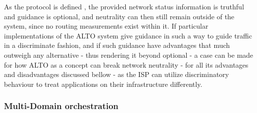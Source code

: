     As the protocol is defined \cite{alto-protocol}, the provided network status information is truthful and guidance is optional, and neutrality can then still remain outside of the system, since no routing measurements exist within it.
    If particular implementations of the ALTO system give guidance in such a way to guide traffic in a discriminate fashion, and if such guidance have advantages that much outweigh any alternative - thus rendering it beyond optional - a case can be made for how ALTO as a concept can break network neutrality - for all its advantages and disadvantages discussed bellow - as the ISP can utilize discriminatory behaviour to treat applications on their infrastructure differently.

\subsubsection{Multi-Domain orchestration}

